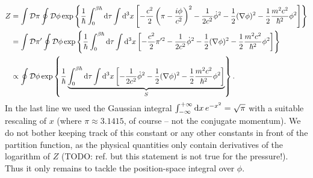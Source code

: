 \begin{equation}
\begin{split}
	Z & =       \int \mathcal{D} \pi  \oint \mathcal{D} \phi \exp \left\{ \frac{1}{\hbar} \int_0^{\beta \hbar} \mathop{}\!\mathrm{d} \tau \int \mathop{}\!\mathrm{d}^3 x \left[ -\frac{c^2}{2} \left( \pi - \frac{i \phi}{c^2}\right )^2 - \frac{1}{2 c^2} \dot{\phi}^2 - \frac12 (\nabla \phi)^2 - \frac12 \frac{m^2 c^2}{\hbar^2} \phi^2 \right] \right\} \\
	  & =       \int \mathcal{D} \pi' \oint \mathcal{D} \phi \exp \left\{ \frac{1}{\hbar} \int_0^{\beta \hbar} \mathop{}\!\mathrm{d} \tau \int \mathop{}\!\mathrm{d}^3 x \left[ -\frac{c^2}{2} \pi'^2                                    - \frac{1}{2 c^2} \dot{\phi}^2 - \frac12 (\nabla \phi)^2 - \frac12 \frac{m^2 c^2}{\hbar^2} \phi^2 \right] \right\} \\
	  & \propto                       \oint \mathcal{D} \phi \exp \left\{ \frac{1}{\hbar} \underbrace{\int_0^{\beta \hbar} \mathop{}\!\mathrm{d} \tau \int \mathop{}\!\mathrm{d}^3 x \left[                                              - \frac{1}{2 c^2} \dot{\phi}^2 - \frac12 (\nabla \phi)^2 - \frac12 \frac{m^2 c^2}{\hbar^2} \phi^2 \right] }_{S} \right\} .
\end{split}
\label{eq:tft:boson_partition_function_momentum_out}
\end{equation}
In the last line we used the Gaussian integral $\int_{-\infty}^{+\infty} \mathop{}\!\mathrm{d} x \, e^{-x^2} = \sqrt{\pi}$ with a suitable rescaling of $x$ (where $\pi \approx 3.1415$, of course -- not the conjugate momentum).
We do not bother keeping track of this constant or any other constants in front of the partition function, as the physical quantities only contain derivatives of the logarithm of $Z$ (TODO: ref. but this statement is not true for the pressure!).
Thus it only remains to tackle the position-space integral over $\phi$.

